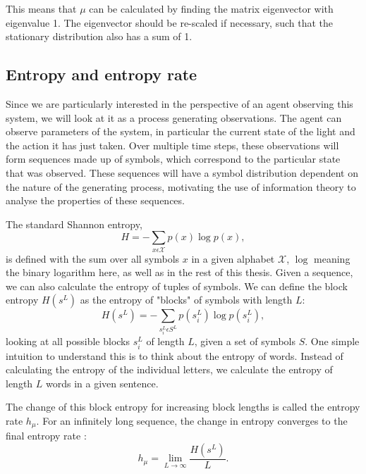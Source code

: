 \documentclass[12pt,a4paper]{article}
\begin{document}
This means that $\mu$ can be calculated by finding the matrix eigenvector with eigenvalue 1.
The eigenvector should be re-scaled if necessary, such that the stationary distribution also has a sum of 1.

\subsection{Entropy and entropy rate} \label{ssec:entropy_rate}
Since we are particularly interested in the perspective of an agent observing this system, we will look at it as a process generating observations.
The agent can observe parameters of the system, in particular the current state of the light and the action it has just taken.
Over multiple time steps, these observations will form sequences made up of symbols, which correspond to the particular state that was observed.
These sequences will have a symbol distribution dependent on the nature of the generating process, motivating the use of information theory to analyse the properties of these sequences.

The standard Shannon entropy,
\begin{equation}
    \label{eq:shannon_entropy}
    H = -\sum_{x \epsilon \mathcal{X}} p(x) \log p(x),
\end{equation}
is defined with the sum over all symbols $x$ in a given alphabet $\mathcal{X}$, $\log$ meaning the binary logarithm here, as well as in the rest of this thesis.
Given a sequence, we can also calculate the entropy of tuples of symbols.
We can define the block entropy $H(s^L)$  as the entropy of "blocks" of symbols with length $L$:
\begin{equation}
    \label{eq:block_entropy}
    H(s^L) = -\sum_{s_i^L \epsilon S^L} p(s_i^L) \log p(s_i^L),
\end{equation}
looking at all possible blocks $s_i^L$ of length $L$, given a set of symbols $S$.
One simple intuition to understand this is to think about the entropy of words.
Instead of calculating the entropy of the individual letters, we calculate the entropy of length $L$ words in a given sentence.

The change of this block entropy for increasing block lengths is called the entropy rate $h_\mu$.
For an infinitely long sequence, the change in entropy converges to the final entropy rate \autocite{crutchfield2003regularities}:
\begin{equation}
    \label{eq:entropy_rate_limit}
    h_\mu = \lim_{L \to \infty} \frac{H(s^L)}{L}.
\end{equation}
\end{document}
